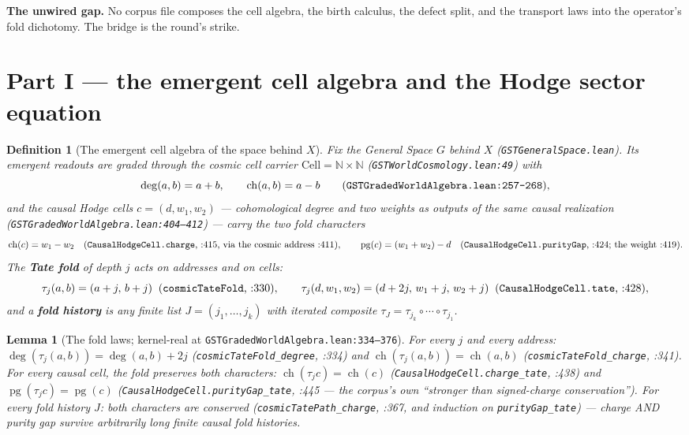 \documentclass[11pt]{article}
\newtheorem{lemma}[theorem]{Lemma}
\newtheorem{definition}[theorem]{Definition}
\begin{document}
\noindent
\textbf{The unwired gap.} No corpus file composes the cell algebra, the birth calculus, the defect split, and the transport laws into the operator's fold dichotomy. The bridge is the round's strike.

\section{Part I — the emergent cell algebra and the Hodge sector equation}

\begin{definition}[The emergent cell algebra of the space behind $X$]
\label{def:cell}
Fix the General Space $G$ behind $X$ (\texttt{GSTGeneralSpace.lean}). Its emergent readouts are graded through the cosmic cell carrier $\mathrm{Cell}=\mathbb{N}\times\mathbb{N}$ (\texttt{GSTWorldCosmology.lean:49}) with
\[
\deg(a,b)=a+b,\qquad \operatorname{ch}(a,b)=a-b \qquad\text{(\texttt{GSTGradedWorldAlgebra.lean:257--268}),}
\]
and the causal Hodge cells $c=(d,w_1,w_2)$ — cohomological degree and two weights as \emph{outputs of the same causal realization} (\texttt{GSTGradedWorldAlgebra.lean:404--412}) — carry the two \emph{fold characters}
\[
\operatorname{ch}(c)=w_1-w_2 \quad\text{(\texttt{CausalHodgeCell.charge}, :415, via the cosmic address :411)},\qquad
\operatorname{pg}(c)=(w_1+w_2)-d \quad\text{(\texttt{CausalHodgeCell.purityGap}, :424; the weight :419)}.
\]
The \textbf{Tate fold} of depth $j$ acts on addresses and on cells:
\[
\tau_j(a,b)=(a+j,\,b+j) \;\;\text{(\texttt{cosmicTateFold}, :330)},\qquad
\tau_j(d,w_1,w_2)=(d+2j,\,w_1+j,\,w_2+j)\;\;\text{(\texttt{CausalHodgeCell.tate}, :428)},
\]
and a \textbf{fold history} is any finite list $J=(j_1,\dots,j_k)$ with iterated composite $\tau_J=\tau_{j_k}\circ\cdots\circ\tau_{j_1}$.
\end{definition}

\begin{lemma}[The fold laws; kernel-real at \texttt{GSTGradedWorldAlgebra.lean:334--376}]
\label{lem:fold}
For every $j$ and every address: $\deg(\tau_j(a,b))=\deg(a,b)+2j$ (\texttt{cosmicTateFold\_degree}, :334) and $\operatorname{ch}(\tau_j(a,b))=\operatorname{ch}(a,b)$ (\texttt{cosmicTateFold\_charge}, :341). For every causal cell, the fold preserves \emph{both} characters: $\operatorname{ch}(\tau_j c)=\operatorname{ch}(c)$ (\texttt{CausalHodgeCell.charge\_tate}, :438) and $\operatorname{pg}(\tau_j c)=\operatorname{pg}(c)$ (\texttt{CausalHodgeCell.purityGap\_tate}, :445 — the corpus's own ``stronger than signed-charge conservation''). For every fold history $J$: both characters are conserved (\texttt{cosmicTatePath\_charge}, :367, and induction on \texttt{purityGap\_tate}) — charge AND purity gap survive arbitrarily long finite causal fold histories.
\end{lemma}
\end{document}
